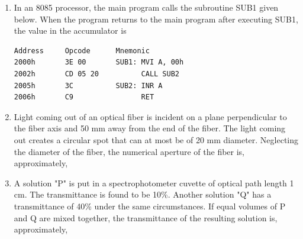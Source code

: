 \documentclass[journal,12pt,onecolumn]{IEEEtran}
\theoremstyle{remark}
\begin{document}
\begin{enumerate}
\item In an 8085 processor, the main program calls the subroutine SUB1 given below. When the program returns to the main program after executing SUB1, the value in the accumulator is
\begin{center}
\begin{verbatim}
Address     Opcode      Mnemonic
2000h       3E 00       SUB1: MVI A, 00h
2002h       CD 05 20          CALL SUB2
2005h       3C          SUB2: INR A
2006h       C9                RET
\end{verbatim}
\end{center}
\hfill{}\begin{enumerate}  \end{enumerate}



\item Light coming out of an optical fiber is incident on a plane perpendicular to the fiber axis and 50 mm away from the end of the fiber. The light coming out creates a circular spot that can at most be of 20 mm diameter. Neglecting the diameter of the fiber, the numerical aperture of the fiber is, approximately,
\hfill{}\begin{enumerate}  \end{enumerate}



\item A solution "P" is put in a spectrophotometer cuvette of optical path length 1 cm. The transmittance is found to be 10\%. Another solution "Q" has a transmittance of 40\% under the same circumstances. If equal volumes of P and Q are mixed together, the transmittance of the resulting solution  is, approximately,

\hfill{}\begin{enumerate}  \end{enumerate}


\end{enumerate}
\end{document}
